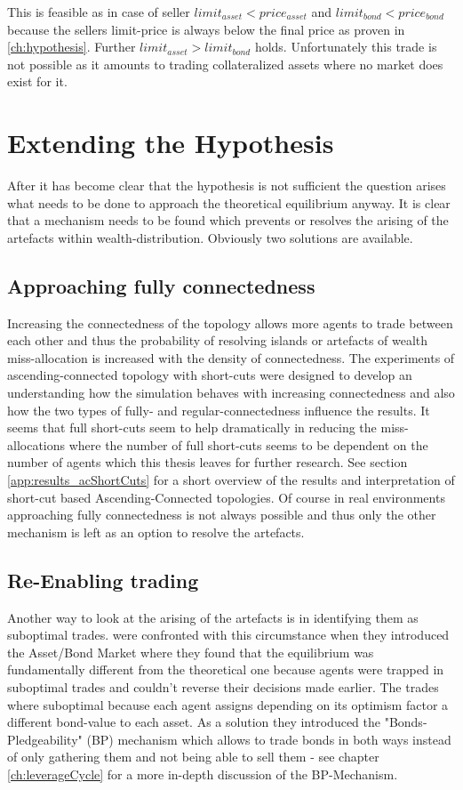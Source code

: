 \documentclass[Bachelorarbeit.tex]{subfiles}
\begin{document}
This is feasible as in case of seller $limit_{asset} < price_{asset}$ and $limit_{bond} < price_{bond}$ because the sellers limit-price is always below the final price as proven in \ref{ch:hypothesis}. Further $limit_{asset} > limit_{bond}$ holds. Unfortunately this trade is not possible as it amounts to trading collateralized assets where no market does exist for it.

\section{Extending the Hypothesis}
After it has become clear that the hypothesis is not sufficient the question arises what needs to be done to approach the theoretical equilibrium anyway. It is clear that a mechanism needs to be found which prevents or resolves the arising of the artefacts within wealth-distribution. Obviously two solutions are available.

\subsection{Approaching fully connectedness}
Increasing the connectedness of the topology allows more agents to trade between each other and thus the probability of resolving islands or artefacts of wealth miss-allocation is increased with the density of connectedness. The experiments of ascending-connected topology with short-cuts were designed to develop an understanding how the simulation behaves with increasing connectedness and also how the two types of  fully- and regular-connectedness influence the results. It seems that full short-cuts seem to help dramatically in reducing the miss-allocations where the number of full short-cuts seems to be dependent on the number of agents which this thesis leaves for further research. See section \ref{app:results_acShortCuts} for a short overview of the results and interpretation of short-cut based Ascending-Connected topologies.
\linebreak
Of course in real environments approaching fully connectedness is not always possible and thus only the other mechanism is left as an option to resolve the artefacts.

\subsection{Re-Enabling trading}
\label{ch:interpretation_reenablingTrading}
Another way to look at the arising of the artefacts is in identifying them as suboptimal trades. \cite{Breuer2015} were confronted with this circumstance when they introduced the Asset/Bond Market where they found that the equilibrium was fundamentally different from the theoretical one because agents were trapped in suboptimal trades and couldn't reverse their decisions made earlier. The trades where suboptimal because each agent assigns depending on its optimism factor a different bond-value to each asset. As a solution they introduced the "Bonds-Pledgeability" (BP) mechanism which allows to trade bonds in both ways instead of only gathering them and not being able to sell them - see chapter \ref{ch:leverageCycle} for a more in-depth discussion of the BP-Mechanism.
\end{document}
